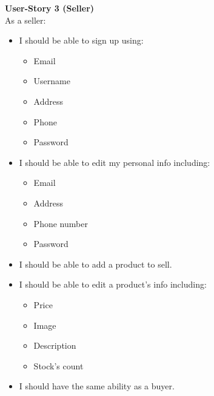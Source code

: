 \documentclass[11pt]{article}
\begin{document}
\textbf{User-Story 3 (Seller)} \\
As a seller:
\begin{itemize}
    \item I should be able to sign up using:
        \begin{itemize}
            \item Email
            \item Username
            \item Address
            \item Phone
            \item Password
        \end{itemize}
    \item I should be able to edit my personal info including:
        \begin{itemize}
            \item Email
            \item Address
            \item Phone number
            \item Password
        \end{itemize}
    \item I should be able to add a product to sell.
    \item I should be able to edit a product's info including:
        \begin{itemize}
            \item Price
            \item Image
            \item Description
            \item Stock's count
        \end{itemize}
    \item I should have the same ability as a buyer.
\end{itemize}

\clearpage
\end{document}
